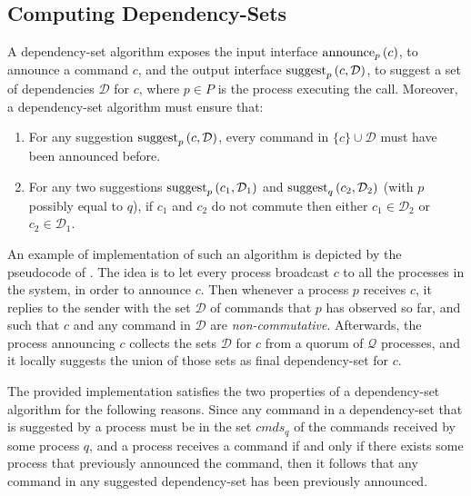 

\subsection{Computing Dependency-Sets}
\label{dep-algo}

A dependency-set algorithm exposes the input interface $\operatorname{announce}_p\left( c \right)$, to announce a command $c$, and the output interface $\operatorname{suggest}_p \left( c,\mathcal{D}\right)$, to suggest a set of dependencies $\mathcal{D}$ for $c$, where $p\in P$ is the process executing the call.  
Moreover, a dependency-set algorithm must ensure that:
\begin{enumerate}
    \item For any suggestion $\operatorname{suggest}_p \left( c,\mathcal{D}\right)$, every command in $\{c\}\cup \mathcal{D}$ must have been announced before.
    \item For any two suggestions $\operatorname{suggest}_p \left( c_1,\mathcal{D}_1\right)$ and $\operatorname{suggest}_q \left( c_2,\mathcal{D}_2\right)$ (with $p$ possibly equal to $q$),  if $c_1$ and $c_2$ do not commute then either $c_1\in \mathcal{D}_2$ or $c_2 \in \mathcal{D}_1$.
\end{enumerate}

An example of implementation of such an algorithm is depicted by the pseudocode of . The idea is to let every process broadcast $c$ to all the processes in the system, in order to announce $c$. Then whenever a process $p$ receives $c$, it replies to the sender with the set $\mathcal{D}$ of commands that $p$ has observed so far, and such that $c$ and any command in $\mathcal{D}$ are \textit{non-commutative}. Afterwards, the process announcing $c$ collects the sets $\mathcal{D}$ for $c$ from a quorum of $\mathcal{Q}$ processes, and it locally suggests the union of those sets as final dependency-set for $c$.

The provided implementation satisfies the two properties of a dependency-set algorithm for the following reasons. Since any command in a dependency-set that is suggested by a process must be in the set $cmds_q$ of the commands received by some process $q$, and a process receives a command if and only if there exists some process that previously announced the command, then it follows that any command in any suggested dependency-set has been previously announced. 

